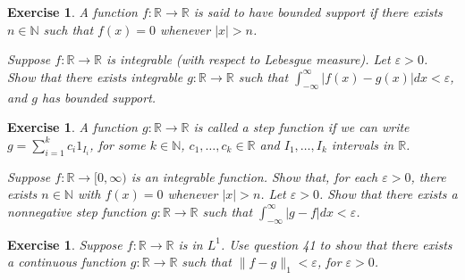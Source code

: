 \documentclass{article}
\newtheorem{exercise}[theorem]{Exercise}
\begin{document}
\begin{exercise}
A function \( f : \mathbb{R} \to \mathbb{R} \) is said to have \textit{bounded support} if there exists \( n \in \mathbb{N} \) such that \( f(x) = 0 \) whenever \( |x| > n \).
    
    Suppose \( f : \mathbb{R} \to \mathbb{R} \) is integrable (with respect to Lebesgue measure). Let \( \varepsilon > 0 \). Show that there exists integrable \( g : \mathbb{R} \to \mathbb{R} \) such that \( \int_{-\infty}^{\infty} |f(x) - g(x)|dx < \varepsilon \), and \( g \) has bounded support.
\end{exercise}
\begin{exercise}
    A function \( g : \mathbb{R} \to \mathbb{R} \) is called a \textit{step function} if we can write \( g = \sum_{i=1}^{k} c_i 1_{I_i} \), for some \( k \in \mathbb{N} \), \( c_1, \dots, c_k \in \mathbb{R} \) and \( I_1, \dots, I_k \) intervals in \( \mathbb{R} \).

    Suppose \( f : \mathbb{R} \to [0, \infty) \) is an integrable function. Show that, for each \( \varepsilon > 0 \), there exists \( n \in \mathbb{N} \) with \( f(x) = 0 \) whenever \( |x| > n \). Let \( \varepsilon > 0 \). Show that there exists a nonnegative step function \( g : \mathbb{R} \to \mathbb{R} \) such that \( \int_{-\infty}^{\infty} |g - f|dx < \varepsilon \).
\end{exercise}   
\begin{exercise}
Suppose \( f : \mathbb{R} \to \mathbb{R} \) is in \( L^1 \). Use question 41 to show that there exists a continuous function \( g : \mathbb{R} \to \mathbb{R} \) such that \( \|f - g\|_1 < \varepsilon \), for \( \varepsilon > 0 \).
\end{exercise}
\end{document}

